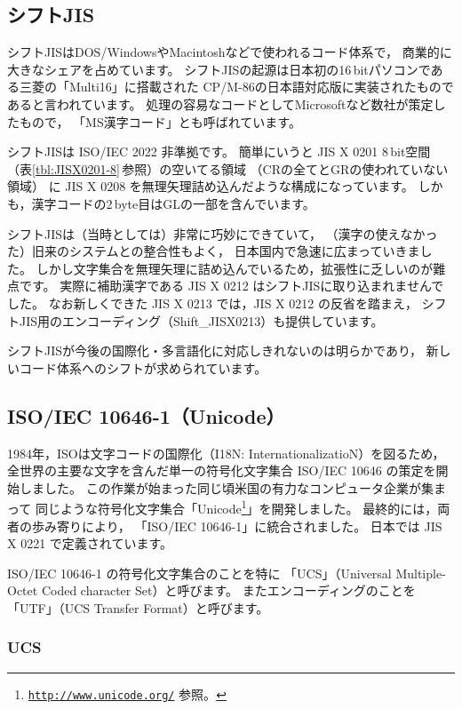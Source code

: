 \documentclass[a4j,10pt,fleqn]{jsarticle}
\begin{document}
\subsection{シフトJIS} \label{sec:shiftJIS}

シフトJISはDOS/WindowsやMacintoshなどで使われるコード体系で，
商業的に大きなシェアを占めています。
シフトJISの起源は日本初の16\,bitパソコンである三菱の「Multi16」に搭載された
CP/M-86の日本語対応版に実装されたものであると言われています。
処理の容易なコードとしてMicrosoftなど数社が策定したもので，
「MS漢字コード」とも呼ばれています。

シフトJISは ISO/IEC 2022 非準拠です。
簡単にいうと JIS X 0201 8\,bit空間（表\ref{tbl:JISX0201-8}\,参照）の空いてる領域
（CRの全てとGRの使われていない領域）
に JIS X 0208 を無理矢理詰め込んだような構成になっています。
しかも，漢字コードの2\,byte目はGLの一部を含んでいます。

シフトJISは（当時としては）非常に巧妙にできていて，
（漢字の使えなかった）旧来のシステムとの整合性もよく，
日本国内で急速に広まっていきました。
しかし文字集合を無理矢理に詰め込んでいるため，拡張性に乏しいのが難点です。
実際に補助漢字である JIS X 0212 はシフトJISに取り込まれませんでした。
なお新しくできた JIS X 0213 では，JIS X 0212 の反省を踏まえ，
シフトJIS用のエンコーディング（Shift\_JISX0213）も提供しています。

シフトJISが今後の国際化・多言語化に対応しきれないのは明らかであり，
新しいコード体系へのシフトが求められています。


\subsection{ISO/IEC 10646-1（Unicode）} \label{sec:Unicode}

1984年，ISOは文字コードの国際化（I18N: InternationalizatioN）を図るため，
全世界の主要な文字を含んだ単一の符号化文字集合 ISO/IEC 10646 の策定を開始しました。
この作業が始まった同じ頃米国の有力なコンピュータ企業が集まって
同じような符号化文字集合「Unicode\footnote{
    \href{http://www.unicode.org/}{\texttt{http://www.unicode.org/}} 参照。
}」を開発しました。
最終的には，両者の歩み寄りにより，
「ISO/IEC 10646-1」に統合されました。
日本では JIS X 0221 で定義されています。

ISO/IEC 10646-1 の符号化文字集合のことを特に
「UCS」（Universal Multiple-Octet Coded character Set）と呼びます。
またエンコーディングのことを
「UTF」（UCS Transfer Format）と呼びます。

\subsubsection{UCS}
\end{document}
